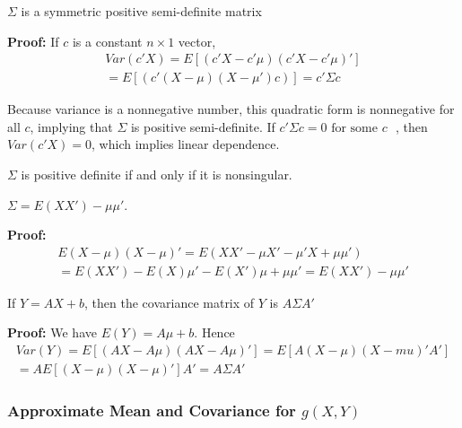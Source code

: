 \documentclass{article}
\begin{document}
\begin{property}
    $\Sigma$ is a symmetric positive semi-definite matrix
\end{property}

\textbf{Proof:} If \(c\) is a constant \(n \times 1\) vector,
\begin{equation*}
    \begin{split}
        Var(c'X)=E[(c'X-c'\mu)(c'X-c'\mu)']\\
        =E[(c'(X-\mu)(X-\mu')c)]=c' \Sigma c
    \end{split}
\end{equation*}

Because variance is a nonnegative number, this quadratic form is nonnegative for all \(c\), implying that \(\Sigma\) is positive semi-definite. If \(c'\Sigma c=0 \text{ for some $c$ }\), then \(Var(c'X)=0\), which implies linear dependence.

\begin{property}
    \(\Sigma\) is positive definite if and only if it is nonsingular.
\end{property}

\begin{property}
    \(\Sigma=E(XX')-\mu\mu'\).
\end{property}

\textbf{Proof:} 
\begin{equation*}
\begin{split}
    E(X-\mu)(X-\mu)'=E(XX'-\mu X'-\mu'X+\mu \mu') \\
    = E(XX')-E(X)\mu'-E(X')\mu+\mu \mu'= E(XX')-\mu \mu'
\end{split}    
\end{equation*}

\begin{property}
    If \(Y=AX+b\), then the covariance matrix of \(Y\) is \(A \Sigma A'\)
\end{property}

\textbf{Proof:} We have \(E(Y)=A\mu+b\). Hence
\begin{equation*}
    \begin{split}
        Var(Y)=E[(AX-A\mu)(AX-A\mu)'] = E[A(X-\mu)(X-mu)'A']\\
        = AE[(X-\mu)(X-\mu)']A' = A \Sigma A'
    \end{split}
\end{equation*}

\subsubsection{Approximate Mean and Covariance for \(g(X,Y)\)}
\end{document}
